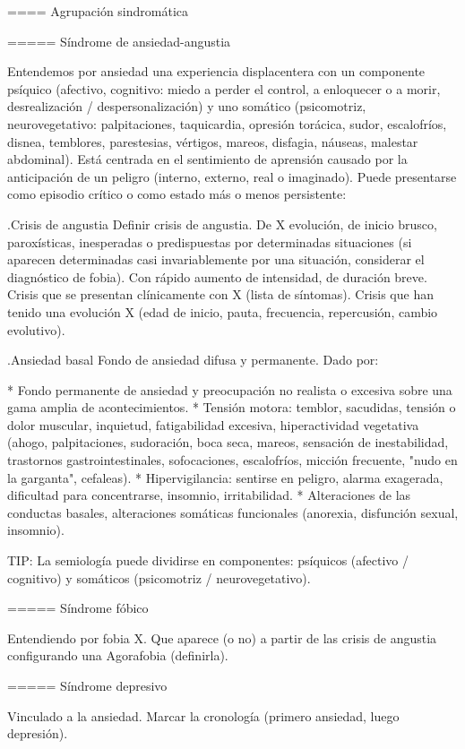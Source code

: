 \documentclass{scrbook}
\begin{document}
==== Agrupación sindromática

===== Síndrome de ansiedad-angustia

Entendemos por ansiedad una experiencia displacentera con un componente psíquico (afectivo, cognitivo: miedo a perder el control, a enloquecer o a morir, desrealización / despersonalización) y uno somático (psicomotriz, neurovegetativo: palpitaciones, taquicardia, opresión torácica, sudor, escalofríos, disnea, temblores, parestesias, vértigos, mareos, disfagia, náuseas, malestar abdominal). Está centrada en el sentimiento de aprensión causado por la anticipación de un peligro (interno, externo, real o imaginado). Puede presentarse como episodio crítico o como estado más o menos persistente:

.Crisis de angustia
Definir crisis de angustia. De X evolución, de inicio brusco, paroxísticas, inesperadas o predispuestas por determinadas situaciones (si aparecen determinadas casi invariablemente por una situación, considerar el diagnóstico de fobia). Con rápido aumento de intensidad, de duración breve.  Crisis que se presentan clínicamente con X (lista de síntomas). Crisis que han tenido una evolución X (edad de inicio, pauta, frecuencia, repercusión, cambio evolutivo).

.Ansiedad basal
Fondo de ansiedad difusa y permanente. Dado por:

* Fondo permanente de ansiedad y preocupación no realista o excesiva sobre una gama amplia de acontecimientos.
* Tensión motora: temblor, sacudidas, tensión o dolor muscular, inquietud, fatigabilidad excesiva, hiperactividad vegetativa (ahogo, palpitaciones, sudoración, boca seca, mareos, sensación de inestabilidad, trastornos gastrointestinales, sofocaciones, escalofríos, micción frecuente, "nudo en la garganta", cefaleas).
* Hipervigilancia: sentirse en peligro, alarma exagerada, dificultad para concentrarse, insomnio, irritabilidad.
* Alteraciones de las conductas basales, alteraciones somáticas funcionales (anorexia, disfunción sexual, insomnio).

TIP: La semiología puede dividirse en componentes: psíquicos (afectivo / cognitivo) y somáticos (psicomotriz / neurovegetativo).

===== Síndrome fóbico

Entendiendo por fobia X. Que aparece (o no) a partir de las crisis de angustia configurando una Agorafobia (definirla).

===== Síndrome depresivo

Vinculado a la ansiedad. Marcar la cronología (primero ansiedad, luego depresión).
\end{document}

